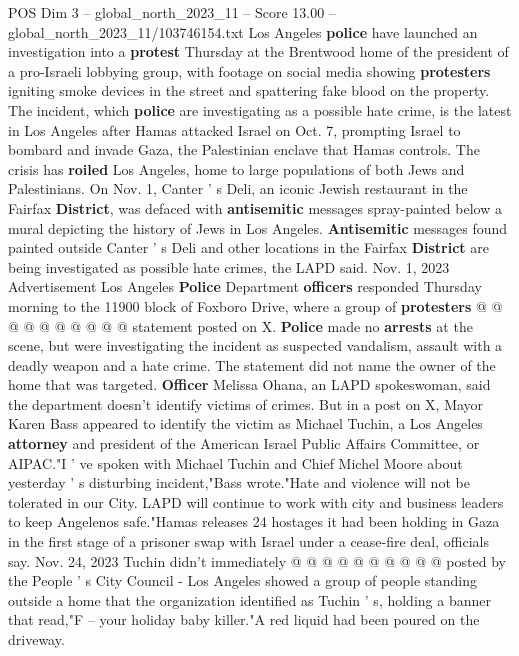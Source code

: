 \begin{textsample}{POS Dim 3 – global\_north\_2023\_11 – Score 13.00 – global\_north\_2023\_11/103746154.txt}  \label{ex:f3_pos_188}
Los Angeles \textbf{police} have launched an investigation into a \textbf{protest} Thursday at the Brentwood home of the president of a pro-Israeli lobbying group, with footage on social media showing \textbf{protesters} igniting smoke devices in the street and spattering fake blood on the property.
The incident, which \textbf{police} are investigating as a possible hate crime, is the latest in Los Angeles after Hamas attacked Israel on Oct. 7, prompting Israel to bombard and invade Gaza, the Palestinian enclave that Hamas controls.
The crisis has \textbf{roiled} Los Angeles, home to large populations of both Jews and Palestinians.
On Nov. 1, Canter ' s Deli, an iconic Jewish restaurant in the Fairfax \textbf{District}, was defaced with \textbf{antisemitic} messages spray-painted below a mural depicting the history of Jews in Los Angeles. \textbf{Antisemitic} messages found painted outside Canter ' s Deli and other locations in the Fairfax \textbf{District} are being investigated as possible hate crimes, the LAPD said.
Nov. 1, 2023 Advertisement Los Angeles \textbf{Police} Department \textbf{officers} responded Thursday morning to the 11900 block of Foxboro Drive, where a group of \textbf{protesters} @ @ @ @ @ @ @ @ @ @ statement posted on X. \textbf{Police} made no \textbf{arrests} at the scene, but were investigating the incident as suspected vandalism, assault with a deadly weapon and a hate crime.
The statement did not name the owner of the home that was targeted. \textbf{Officer} Melissa Ohana, an LAPD spokeswoman, said the department doesn't identify victims of crimes.
But in a post on X, Mayor Karen Bass appeared to identify the victim as Michael Tuchin, a Los Angeles \textbf{attorney} and president of the American Israel Public Affairs Committee, or AIPAC."I ' ve spoken with Michael Tuchin and Chief Michel Moore about yesterday ' s disturbing incident,"Bass wrote."Hate and violence will not be tolerated in our City.
LAPD will continue to work with city and business leaders to keep Angelenos safe."Hamas releases 24 hostages it had been holding in Gaza in the first stage of a prisoner swap with Israel under a cease-fire deal, officials say.
Nov. 24, 2023 Tuchin didn't immediately @ @ @ @ @ @ @ @ @ @ posted by the People ' s City Council - Los Angeles showed a group of people standing outside a home that the organization identified as Tuchin ' s, holding a banner that read,"F -- your holiday baby killer."A red liquid had been poured on the driveway.

\end{textsample}

